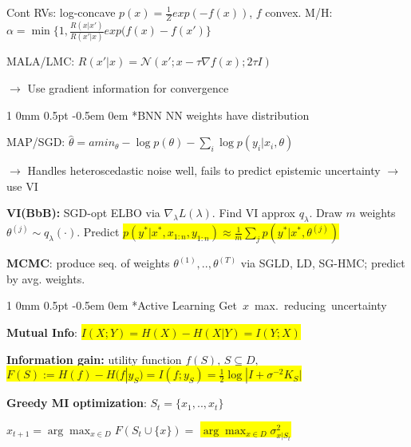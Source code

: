 \documentclass[11pt,landscape,a4paper,fleqn]{article}
\makeatletter
\newcommand*{\rsection}{%
	\@startsection{section}%
	{1}%
	{0mm}%
	{0.5pt}%
	{-0.5em \@plus 0em}
	{\color{myorange}\sffamily\small\bfseries}}
\newcommand{\mhl}[1]{\setlength{\fboxsep}{0pt}\colorbox{yellow}{#1}}
\makeatother
\begin{document}
\begin{multicols*}{4}
Cont RVs: log-concave $p(x) = \frac{1}{Z} exp(-f(x))$, $f$ convex. M/H: $\alpha = \min \{ 1, \frac{R(x|x')}{R(x'|x)}exp(f(x) - f(x')\}$

MALA/LMC: $R(x' | x) = \mathcal{N}(x'; x - \tau \nabla f(x); 2\tau I)$

$\rightarrow$ Use gradient information for convergence

\vspace*{1mm}
\rsection*{BNN} NN weights have distribution

{\fontsize{9.5}{6}\selectfont MAP/SGD: $\hat{\theta} = amin_\theta -\log p(\theta) - \sum_{i} \log p(y_i | x_i, \theta)$}

$\rightarrow$ Handles heteroscedastic noise well, fails to predict epistemic uncertainty $\rightarrow$ use VI

\textbf{VI(BbB):} SGD-opt ELBO via $\nabla_\lambda L(\lambda)$. Find VI approx $q_\lambda$. Draw $m$ weights $\theta^{(j)} \sim q_\lambda(\cdot)$. Predict \mhl{$p(y^* | x^*, x_{1:n}, y_{1:n}) \approx \frac{1}{m} \sum_j p(y^* | x^*, \theta^{(j)})$}

\textbf{MCMC}: produce seq. of weights {\fontsize{9}{6}\selectfont $\theta^{(1)},..,\theta^{(T)}$} via SGLD, LD, SG-HMC; predict by avg. weights.


\rsection*{Active Learning}
{\fontsize{9}{0}\selectfont \mbox{Get $x$ max. reducing uncertainty}}

\textbf{Mutual Info}: {\fontsize{9.5}{6}\selectfont \mhl{$I(X;Y) = H(X) - H(X | Y) = I(Y;X)$}}


\textbf{Information gain:} utility function $f(S)$, $S \subseteq D$, \mhl{\fontsize{9}{6}\selectfont $F(S) := H(f) - H(f | y_S) = I(f;y_S) = \frac{1}{2} \log |I + \sigma^{-2} K_S|$}

\textbf{Greedy MI optimization}: $S_t = \{x_1,.., x_t\}$

$x_{t+1} = \arg\max_{x \in D} F(S_t \cup \{x\}) = $ \mhl{$\arg\max_{x \in D} \sigma_{x | S_t}^2$}

\iffalse
\vspace*{-1mm}
$\rightarrow$ constant-factor near optimal.
\vspace*{-1mm}
\fi


\end{multicols*}
\end{document}
